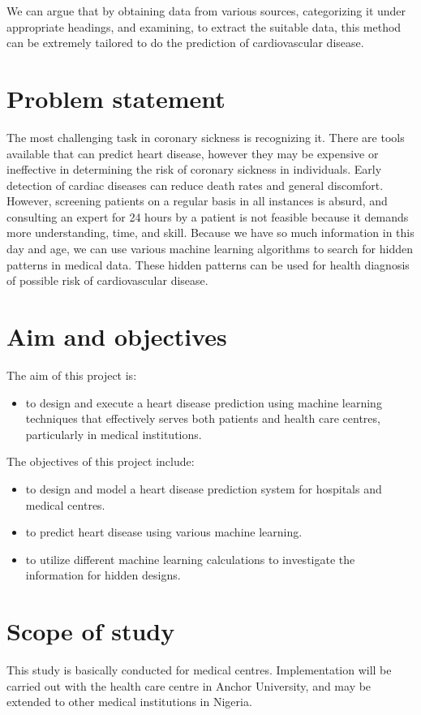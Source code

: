 We can argue that by obtaining data from various sources, categorizing it under appropriate headings, and examining, to extract the suitable data, this method can be extremely tailored to do the prediction of cardiovascular disease.

\section{Problem statement}
The most challenging task in coronary sickness is recognizing it. There are tools available that can predict heart disease, however they may be expensive or ineffective in determining the risk of coronary sickness in individuals. Early detection of cardiac diseases can reduce death rates and general discomfort. However, screening patients on a regular basis in all instances is absurd, and consulting an expert for 24 hours by a patient is not feasible because it demands more understanding, time, and skill. Because we have so much information in this day and age, we can use various machine learning algorithms to search for hidden patterns in medical data. These hidden patterns can be used for health diagnosis of possible risk of cardiovascular disease.

\section{Aim and objectives}
The aim of this project is:
\begin{itemize}
	\item {to design and execute a heart disease prediction using machine learning techniques that effectively serves both patients and health care centres, particularly in medical institutions.}
\end{itemize}
The objectives of this project include:
\begin{itemize}
	\item {to design and model a heart disease prediction system for hospitals and medical centres.}
	\item {to predict heart disease using various machine learning.}
	\item {to utilize different machine learning calculations to investigate the information for hidden designs.}
\end{itemize}

\section{Scope of study}
This study is basically conducted for medical centres. Implementation will be carried out with the health care centre in Anchor University, and may be extended to other medical institutions in Nigeria. 

